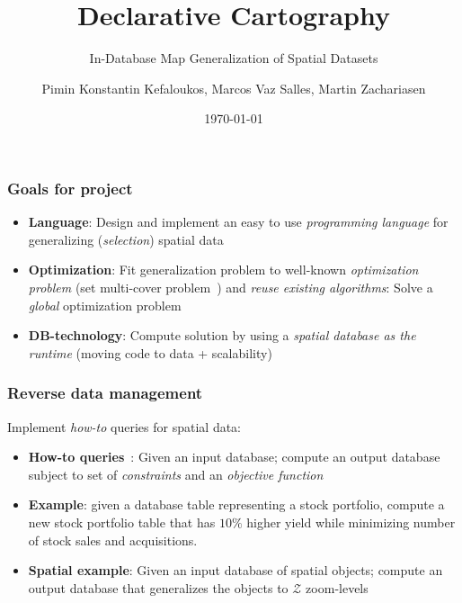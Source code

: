\documentclass{beamer}
\title{Declarative Cartography}
\subtitle{In-Database Map Generalization of Spatial Datasets}
\author{Pimin Konstantin Kefaloukos, Marcos Vaz Salles, Martin Zachariasen}
\date{\today}
\begin{document}
\frame{\titlepage}

\frame
{
  \frametitle{Goals for project}
  \begin{itemize}
  \item \textbf{Language}: Design and implement an easy to use \emph{programming language} for generalizing (\emph{selection}) spatial data 
  \item \textbf{Optimization}: Fit generalization problem to well-known \emph{optimization problem} (set multi-cover problem~\cite{vazirani}) and \emph{reuse existing algorithms}: Solve a \emph{global} optimization problem
  \item \textbf{DB-technology}: Compute solution by using a \emph{spatial database as the runtime} (moving code to data + scalability)
  \end{itemize}
  \begin{center}
  \end{center}
}

\frame
{
  \frametitle{Reverse data management}
  Implement \emph{how-to} queries for spatial data:
  \begin{itemize}
  \item \textbf{How-to queries}~\cite{reversedatamanagement}: Given an input database; compute an output database subject to set of \emph{constraints} and an \emph{objective function}
  \item \textbf{Example}: given a database table representing a stock portfolio, compute a new stock portfolio table that has $10\%$ higher yield while minimizing number of stock sales and acquisitions.
  \item \textbf{Spatial example}: Given an input database of spatial objects; compute an output database that generalizes the objects to $\mathcal{Z}$ zoom-levels
  \end{itemize}
}
\end{document}
